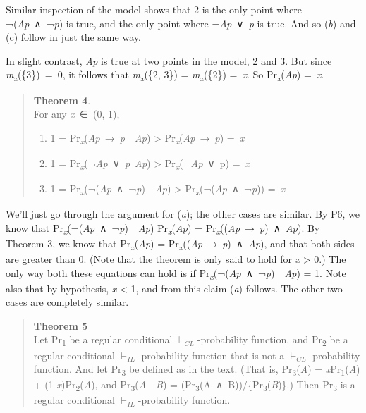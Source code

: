 \documentclass[
  10pt,
  letterpaper,
  DIV=11,
  numbers=noendperiod,
  twoside]{scrartcl}
\providecommand{\tightlist}{%
  \setlength{\itemsep}{0pt}\setlength{\parskip}{0pt}}\usepackage{longtable,booktabs,array}
\begin{document}
Similar inspection of the model shows that 2 is the only point where
¬(\emph{Ap}~∧~¬\emph{p}) is true, and the only point where
¬\emph{Ap}~∨~\emph{p} is true. And so (\emph{b}) and (c) follow in just
the same way.

In slight contrast, \emph{Ap} is true at two points in the model, 2 and
3. But since \emph{m\textsubscript{x}}(\{3\})~=~0, it follows that
\emph{m\textsubscript{x}}(\{2, 3\}) = \emph{m\textsubscript{x}}(\{2\})
=~\emph{x}. So Pr\textsubscript{\emph{x}}(\emph{Ap}) =~\emph{x}.

\begin{quote}
\textbf{Theorem 4}.\\
For any \emph{x}~∈~(0, 1),

\begin{enumerate}
\def\labelenumi{\alph{enumi}.}
\tightlist
\item
  1 =
  Pr\textsubscript{\emph{x}}(\emph{Ap}~→~\emph{p}~\textbar~\emph{Ap})
  \textgreater{} Pr\textsubscript{\emph{x}}(\emph{Ap}~→~\emph{p})
  =~\emph{x}
\item
  1 =
  Pr\textsubscript{\emph{x}}(¬\emph{Ap}~∨~\emph{p}\textbar~\emph{Ap})
  \textgreater{} Pr\textsubscript{\emph{x}}(¬\emph{Ap}~∨~p) =~\emph{x}
\item
  1 =
  Pr\textsubscript{\emph{x}}(¬(\emph{Ap}~∧~¬\emph{p})~\textbar~\emph{Ap})
  \textgreater{} Pr\textsubscript{\emph{x}}(¬(\emph{Ap}~∧~¬\emph{p}))
  =~\emph{x}
\end{enumerate}
\end{quote}

We'll just go through the argument for (\emph{a}); the other cases are
similar. By P6, we know that
Pr\textsubscript{\emph{x}}(¬(\emph{Ap}~∧~¬\emph{p})~\textbar~\emph{Ap})
Pr\textsubscript{\emph{x}}(\emph{Ap}) =
Pr\textsubscript{\emph{x}}((\emph{Ap}~→~\emph{p})~∧~\emph{Ap}). By
Theorem 3, we know that Pr\textsubscript{\emph{x}}(\emph{Ap}) =
Pr\textsubscript{\emph{x}}((\emph{Ap}~→~\emph{p})~∧~\emph{Ap}), and that
both sides are greater than 0. (Note that the theorem is only said to
hold for \emph{x} \textgreater{} 0.) The only way both these equations
can hold is if
Pr\textsubscript{\emph{x}}(¬(\emph{Ap}~∧~¬\emph{p})~\textbar~\emph{Ap})
= 1. Note also that by hypothesis, \emph{x} \textless{} 1, and from this
claim (\emph{a}) follows. The other two cases are completely similar.

\begin{quote}
\textbf{Theorem 5}\\
Let Pr\textsubscript{1} be a regular conditional
\(\vdash_{CL}\)-probability function, and Pr\textsubscript{2} be a
regular conditional \(\vdash_{IL}\)-probability function that is not a
\(\vdash_{CL}\)-probability function. And let Pr\textsubscript{3} be
defined as in the text. (That is, Pr\textsubscript{3}(\emph{A}) =
\emph{x}Pr\textsubscript{1}(\emph{A}) +
(1-\emph{x})Pr\textsubscript{2}(\emph{A}), and
Pr\textsubscript{3}(\emph{A}~\textbar~\emph{B}) =
(Pr\textsubscript{3}(A~∧~B))/\{Pr\textsubscript{3}(\emph{B})\}.) Then
Pr\textsubscript{3} is a regular conditional \(\vdash_{IL}\)-probability
function.
\end{quote}
\end{document}
